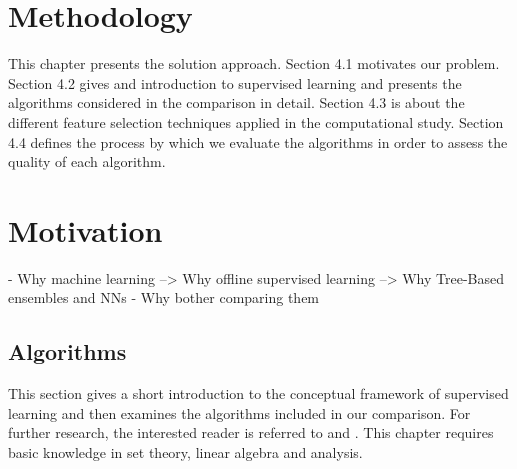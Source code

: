 \chapter{Methodology}
This chapter presents the solution approach.
Section 4.1 motivates our problem. 
Section 4.2 gives and introduction to supervised learning and presents the algorithms considered in the comparison in detail.
Section 4.3 is about the different feature selection techniques applied in the computational study. 
Section 4.4 defines the process by which we evaluate the algorithms in order to assess the quality of each algorithm.

\chapter{Motivation}

- Why machine learning --> Why offline supervised learning --> Why Tree-Based ensembles and NNs
- Why bother comparing them


\section{Algorithms}

This section gives a short introduction to the conceptual framework of supervised learning and then examines the algorithms included in our comparison. For further research, the interested reader is referred to \cite{Bishop} and \cite{SLFoundations}. This chapter requires basic knowledge in set theory, linear algebra and analysis.

